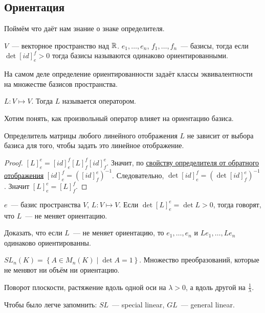 \subsection{Ориентация}
\begin{motivation}
    Поймём что даёт нам знание о знаке определителя.
\end{motivation}
\begin{definition}
    $V$~--- векторное пространство над  $\mathbb{R}$. $e_1,\dots, e_n$, $f_1,\dots, f_n$~--- базисы,
    тогда если $\det[id]^f_e>0$ тогда базисы называются одинаково ориентированными.
\end{definition}
\begin{remark}
    На самом деле определение ориентированности задаёт классы эквивалентности на множестве
    базисов пространства.
\end{remark}
\begin{definition}
    $L\colon V\mapsto V$. Тогда $L$ называется оператором.
\end{definition}
\begin{motivation}
    Хотим понять, как произвольный оператор влияет на ориентацию базиса.
\end{motivation}
\begin{remark}
    Определитель матрицы любого линейного отображения $L$ не зависит от выбора базиса для того, чтобы
    задать это линейное отображение.
\end{remark}
\begin{proof}
    $[L]^e_e = [id]^f_e [L]^f_f [id]^e_f$. Значит, по 
     \hyperref[thm:Свойства определителя]{свойству определителя от обратного отображения}
    $[id]^f_e = ([id]^e_f)^{-1}$. Следовательно, $\det [id]^f_e = (\det [id]^e_f)^{-1}$.
    Значит $[L]^e_e = [L]^f_f$.
\end{proof}
\begin{definition}
    $e$~--- базис пространства $V$, $L\colon V\mapsto V$. Если $\det [L]^e_e = \det L > 0$, тогда говорят, что $L$~--- не меняет ориентацию.
\end{definition}
\begin{task}
    Доказать, что если $L$~--- не меняет ориентацию, то $e_1,\dots, e_n$ и $Le_1,\dots, Le_n$ одинаково ориентированны.
\end{task}
\begin{definition}
    $SL_n(K) = \left\{A\in M_n(K)\mid \det A = 1 \right\}$. Множество преобразований, которые не меняют ни объём ни ориентацию.
\end{definition}
\begin{example}
    Поворот плоскости, растяжение вдоль одной оси на $\lambda > 0$, а вдоль другой на $\frac{1}{\lambda}$.
\end{example}
\begin{remark}
    Чтобы было легче запомнить: $SL$~--- special linear, $GL$~--- general linear.
\end{remark}
